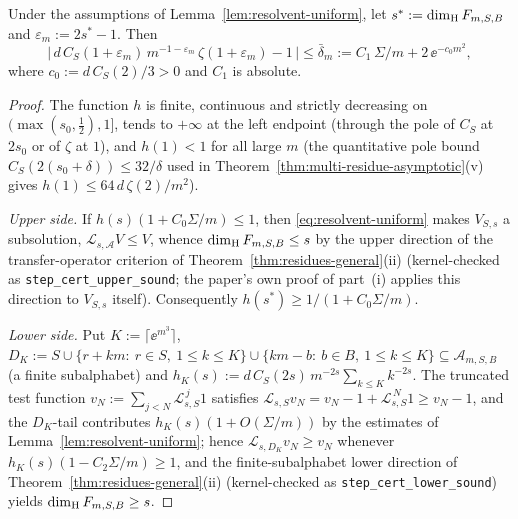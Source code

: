 \begin{lemma}\label{lem:master}
Under the assumptions of Lemma~\ref{lem:resolvent-uniform}, let
$s^*:=\dim_{\mathrm{H}} F_{m,S,B}$ and $\varepsilon_m:=2s^*-1$.  Then
\begin{equation}\label{eq:master}
\bigl|\,d\,C_S(1+\varepsilon_m)\,m^{-1-\varepsilon_m}\,\zeta(1+\varepsilon_m)-1\,\bigr|
\le \bar\delta_m:=C_1\,\Sigma/m+2\,\ee^{-c_0m^2},
\end{equation}
where $c_0:=d\,C_S(2)/3>0$ and $C_1$ is absolute.
\end{lemma}

\begin{proof}
The function $h$ is finite, continuous and strictly decreasing on
$(\max(s_0,\tfrac12),1]$, tends to $+\infty$ at the left endpoint (through the
pole of $C_S$ at $2s_0$ or of $\zeta$ at $1$), and $h(1)<1$ for all large $m$
(the quantitative pole bound $C_S(2(s_0+\delta))\le 32/\delta$ used in
Theorem~\ref{thm:multi-residue-asymptotic}(v) gives $h(1)\le 64\,d\,\zeta(2)/m^2$).

\emph{Upper side.}  If $h(s)(1+C_0\Sigma/m)\le1$, then
\eqref{eq:resolvent-uniform} makes $V_{S,s}$ a subsolution,
$\mathcal L_{s,\mathcal A}V\le V$, whence $\dim_{\mathrm{H}} F_{m,S,B}\le s$ by the upper
direction of the transfer-operator criterion of
Theorem~\ref{thm:residues-general}(ii) (kernel-checked as
\texttt{step\_cert\_upper\_sound}; the paper's own proof of part~(i) applies
this direction to $V_{S,s}$ itself).  Consequently
$h(s^*)\ge1/(1+C_0\Sigma/m)$.

\emph{Lower side.}  Put $K:=\lceil\ee^{m^3}\rceil$,
$D_K:=S\cup\{r+km:\ r\in S,\ 1\le k\le K\}\cup\{km-b:\ b\in B,\ 1\le k\le K\}
\subseteq\mathcal A_{m,S,B}$ (a finite subalphabet) and
$h_K(s):=d\,C_S(2s)\,m^{-2s}\sum_{k\le K}k^{-2s}$.  The truncated test function
$v_N:=\sum_{j<N}\mathcal L_{s,S}^{\,j}1$ satisfies
$\mathcal L_{s,S}v_N=v_N-1+\mathcal L_{s,S}^{\,N}1\ge v_N-1$, and the $D_K$-tail
contributes $h_K(s)(1+O(\Sigma/m))$ by the estimates of
Lemma~\ref{lem:resolvent-uniform}; hence $\mathcal L_{s,D_K}v_N\ge v_N$
whenever $h_K(s)(1-C_2\Sigma/m)\ge1$, and the finite-subalphabet lower
direction of Theorem~\ref{thm:residues-general}(ii) (kernel-checked as
\texttt{step\_cert\_lower\_sound}) yields $\dim_{\mathrm{H}} F_{m,S,B}\ge s$.


\end{proof}
